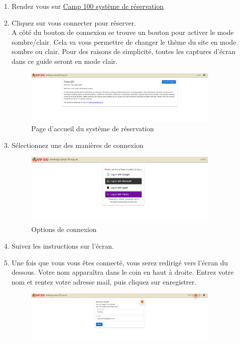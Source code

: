 \documentclass[a4paper, 11pt]{report}
\begin{document}
\begin{enumerate}
    \item Rendez vous sur \href{https://bookings.camp100.org.uk}{Camp 100 syst\`eme de r\'eservation}
    \item Cliquez sur vous connecter pour r\'eserver.\\
    A côt\'e du bouton de connexion se trouve un bouton pour activer le mode sombre/clair. Cela va vous permettre de changer le th\`eme du site en mode sombre ou clair. Pour des raisons de simplicit\'e, toutes les captures d'\'ecran dans ce guide seront en mode clair. 
    \begin{figure}[H]
        \centering
        \includegraphics[width=0.9\textwidth]{assets/1-homepage.png}
        \caption{Page d'accueil du syst\`eme de r\'eservation}
    \end{figure}
    \item S\'electionnez une des mani\`eres de connexion
    \begin{figure}[H]
        \centering
        \includegraphics[width=0.9\textwidth]{assets/1-login.png}
        \caption{Options de connexion}
    \end{figure}
    \item Suivez les instructions sur l'\'ecran.
    \item Une fois que vous vous \^etes connect\'e, vous serez redirig\'e vers l'\'ecran du dessous. Votre nom apparaîtra dans le coin en haut \`a droite. Entrez votre nom et rentez votre adresse mail, puis cliquez sur enregistrer.
    \begin{figure}[H]
        \centering
        \includegraphics[width=0.9\textwidth]{assets/1-create-account.png}

\end{figure}
\end{enumerate}
\end{document}
